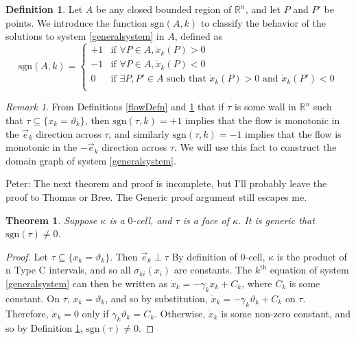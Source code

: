 \documentclass[12pt]{article}
\newtheorem{theorem}{Theorem}[section]
\theoremstyle{definition}
\newtheorem{defn}{Definition}[section]
\theoremstyle{remark}
\newtheorem*{remark}{Remark}
\newcommand\sgn{\text{sgn}}
\newcommand{\bbR}{\mathbb{R}} %
\begin{document}
\begin{defn} \label{sgnDefn}
Let $A$ be any closed bounded region of $\bbR^n$, and let $P$ and $P'$ be points.  We introduce the function $\sgn(A,k)$ to classify the behavior of the solutions to system \eqref{generalsystem} in $A$, defined as 
\begin{equation}
\sgn(A,k)=
\begin{cases}
+1	&	\text{if } \forall P\in A, \dot x_k (P)>0\\
-1	&	\text{if } \forall P\in A, \dot x_k (P)<0\\
0	&	\text{if } \exists P,P'\in A \text{ such that }  \dot x_k (P)>0 \text{ and } \dot x_k (P')<0\\
\end{cases}
\end{equation}
\end{defn}

\begin{remark}
From Definitions \ref{flowDefn} and \ref{sgnDefn} that if $\tau$ is some wall in $\mathbb{R}^n$ such that $\tau \subseteq \{x_k=\vartheta_k\}$, then $\sgn(\tau,k)=+1$ implies that the flow is monotonic in the $\vec e_k$ direction across $\tau$, and similarly $\sgn(\tau,k)=-1$ implies that the flow is monotonic in the $-\vec e_k$ direction across $\tau$. We will use this fact to construct the domain graph of system \eqref{generalsystem}.
\end{remark}

{\color{cyan} Peter: The next theorem and proof is incomplete, but I'll probably leave the proof to Thomas or Bree. The Generic proof argument still escapes me.}

\begin{theorem}
Suppose $\kappa$ is a  $0$-cell, and $\tau$ is a face of $\kappa$. It is generic that $\sgn(\tau)\neq 0$.
\end{theorem}

\begin{proof}
Let $\tau\subseteq \{x_k=\vartheta_k\}$. Then $\vec{e}_k\perp \tau$ By definition of  $0$-cell, $\kappa$ is the product of n Type C intervals, and so all $\sigma_{ki}(x_i)$ are constants. The $k^\text{th}$ equation of system \eqref{generalsystem} can then be written as $\dot x_k=-\gamma_kx_k+C_k$, where $C_k$ is some constant. On $\tau$, $x_k=\vartheta_k$, and so by substitution, $\dot x_k = -\gamma_k \vartheta_k + C_k$ on $\tau$. Therefore, $\dot{x}_k=0$ only if $\gamma_k\vartheta_k=C_k$. Otherwise, $\dot{x}_k$ is some non-zero constant, and so by Definition \ref{sgnDefn}, $\sgn(\tau)\neq 0$.
\end{proof}
\end{document}
